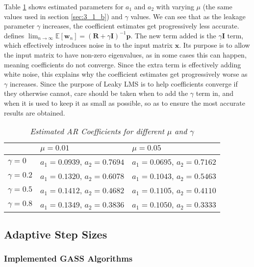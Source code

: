 \documentclass[./main.tex]{subfiles}
\begin{document}
Table \ref{tab:3_1_f} shows estimated parameters for $a_1$ and $a_2$ with varying $\mu$ (the same values used in section \ref{sec:3_1_b}) and $\gamma$ values. We can see that as the leakage parameter $\gamma$ increases, the coefficient estimates get progressively less accurate. \cite{Kamenetsky2004} defines $ \lim_{n \to \infty } \mathbb{E}[\mathbf{w}_n] = (\mathbf{R} + \gamma \mathbf{I})^{-1} \mathbf{p} $. The new term added is the $\gamma \mathbf{I} $ term, which effectively introduces noise in to the input matrix $ \mathbf{x} $. Its purpose is to allow the input matrix to have non-zero eigenvalues, as in some cases this can happen, meaning coefficients do not converge. Since the extra term is effectively adding white noise, this explains why the coefficient estimates get progressively worse as $ \gamma $ increases. Since the purpose of Leaky LMS is to help coefficients converge if they otherwise cannot, care should be taken when to add the $ \gamma $ term in, and when it is used to keep it as small as possible, so as to ensure the most accurate results are obtained.

\begin{table}[h]
\centering
\begin{tabular}{|l|l|l|}
\hline
               & $\mu = 0.01 $                  & $\mu = 0.05 $                  \\ \hline
$\gamma = 0$   & $a_1 = 0.0939$, $a_2 = 0.7694$ & $a_1 = 0.0695$, $a_2 = 0.7162$ \\ \hline
$\gamma = 0.2$ & $a_1 = 0.1320$, $a_2 = 0.6078$ & $a_1 = 0.1043$, $a_2 = 0.5463$ \\ \hline
$\gamma = 0.5$ & $a_1 = 0.1412$, $a_2 = 0.4682$ & $a_1 = 0.1105$, $a_2 = 0.4110$ \\ \hline
$\gamma = 0.8$ & $a_1 = 0.1349$, $a_2 = 0.3836$ & $a_1 = 0.1050$, $a_2 = 0.3333$ \\ \hline
\end{tabular}
\caption{\textit{Estimated AR Coefficients for different $\mu$ and $\gamma$}}
\label{tab:3_1_f}
\end{table}

\subsection{Adaptive Step Sizes}

\subsubsection{Implemented GASS Algorithms}
\end{document}
